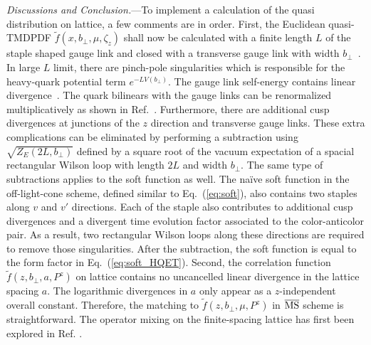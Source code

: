 \documentclass[twocolumn,aps,prd,preprintnumbers,superscriptaddress,10pt]{revtex4-1}
\begin{document}
\vspace{0.2cm}

{\it Discussions and Conclusion.}---To implement a calculation of the quasi distribution on lattice, a few comments are
in order. First, the Euclidean quasi-TMDPDF $\tilde f(x,b_\perp,\mu,\zeta_z)$ shall now be calculated with a finite length $L$ of the staple shaped gauge link and closed with a transverse gauge link with width $b_\perp$~\cite{Musch:2010ka,Ji:2018hvs}.
%
In large $L$ limit, there are pinch-pole singularities which is responsible for the heavy-quark potential term $e^{-L V(b_\perp)}$.
%
The gauge link self-energy contains linear divergence~\cite{Dotsenko:1979wb,Brandt:1981kf}. The quark bilinears with the gauge links
can be renormalized multiplicatively as shown in Ref.~\cite{Ishikawa:2017faj,Ji:2017oey}.
%
Furthermore, there are additional cusp divergences at junctions of the $z$ direction and transverse gauge links.
%
These extra complications can be eliminated by performing a subtraction using $\sqrt{Z_E(2L,b_\perp)}$ defined by a square root of the vacuum expectation of a spacial rectangular Wilson loop with length $2L$ and width $b_\perp$.
%
The same type of subtractions applies to the soft function as well.
%
The na\"{i}ve soft function in the off-light-cone scheme, defined similar to Eq.~(\ref{eq:soft}), also contains two staples along $v$ and $v'$ directions.
%
Each of the staple also contributes to additional cusp divergences and a divergent time evolution factor associated to the color-anticolor pair.
%
As a result, two rectangular Wilson loops along these directions are required to remove those singularities.
%
After the subtraction, the soft function is equal to the form factor in Eq.~(\ref{eq:soft_HQET}).
%
Second, the correlation function $\tilde f(z,b_\perp, a,P^z)$ on lattice contains no uncancelled linear divergence in the lattice spacing $a$. The logarithmic divergences in $a$ only appear as a $z$-independent overall constant. Therefore,
the matching to $\tilde f(z,b_\perp, \mu,P^z)$ in $\overline{\rm MS}$ scheme is straightforward.
%
The operator mixing on the finite-spacing lattice has first been explored in Ref. \cite{Shanahan:2019zcq}.
\end{document}
